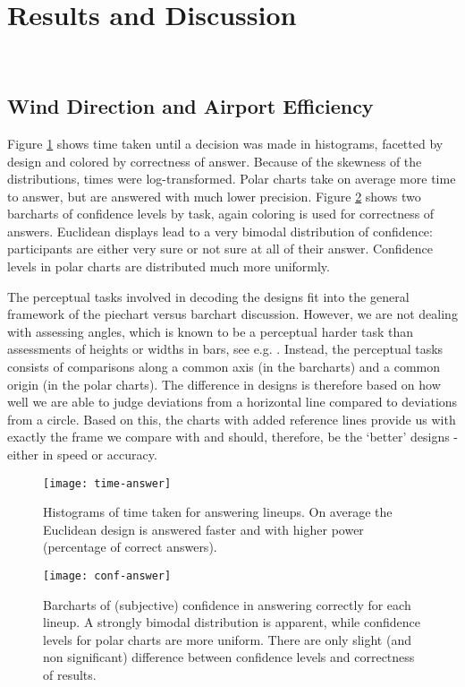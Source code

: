 \section{Results and Discussion}~\label{results}

\subsection{Wind Direction and Airport Efficiency}
Figure \ref{fig:time} shows time taken until a decision was made in histograms, facetted by design and colored by correctness of answer. Because of the skewness of the distributions, times were log-transformed. Polar charts take on average more time to answer, but are answered with much lower precision. Figure \ref{fig:conf} shows two barcharts of confidence levels by task, again coloring is used for correctness of answers. Euclidean displays lead to a very bimodal distribution of confidence: participants are either very sure or not sure at all of their answer. Confidence levels in polar charts are distributed much more uniformly.

The perceptual tasks involved in decoding the designs fit into the general framework of the piechart versus barchart discussion. However, we are not dealing with assessing angles, which is known to be a perceptual harder task than assessments of heights or widths in bars, see e.g. \cite{cleveland:1984, robbins:2004, Kosslyn:2006, few:2009}. Instead, the perceptual tasks consists of comparisons along a common axis (in the barcharts) and a common origin (in the polar charts). The difference in designs is therefore based on how well we are able to judge deviations from a horizontal line compared to deviations from a circle. Based on this, the charts with added reference lines provide us with exactly the frame we compare with and should, therefore, be the `better' designs - either in speed or accuracy.

\begin{figure}[hbtp] %
   \centering
   \texttt{[image: time-answer]} 
   \caption{Histograms of time taken for answering lineups. On average the Euclidean design is answered faster and with higher power (percentage of correct answers). }
   \label{fig:time}
\end{figure}

\begin{figure}[hbtp] %
   \centering
   \texttt{[image: conf-answer]} 
   \caption{Barcharts of (subjective) confidence in answering correctly for each lineup. A strongly bimodal distribution is apparent, while confidence levels for polar charts are more uniform. There are only slight (and non significant) difference between confidence levels and correctness of results.}
   \label{fig:conf}
\end{figure}



